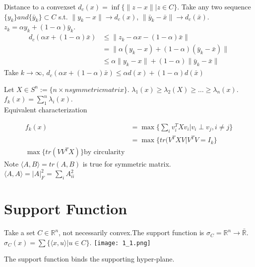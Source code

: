 \documentclass[11pt]{book} %
\def\R{\mathbb{R}}
\newcommand{\cvx}{convex}
\begin{document}
\begin{example}[Distance]
Distance to a \cvx  set $d_c(x) = \inf \{ \| z-x \| | z \in C \}$. Take any two sequence $\{ y_k\} and \{ \bar{y}_k\} \subset C$ s.t. $\| y_k - x\| \to d_c(x)$, $\| \bar{y}_k - \bar{x}\| \to d_c(\bar{x})$. $z_k = \alpha y_k + (1 - \alpha) \bar{y}_k$.
\begin{align*}
d_c(\alpha x + (1-\alpha) \bar{x}) &\le \| z_k - \alpha x - (1 - \alpha) \bar{x}\| \\
& = \| \alpha(y_k - x) + (1 - \alpha)(\bar{y}_k - \bar{x})\| \\
& \le \alpha \| y_k - x\| + (1 - \alpha ) \|\bar{y}_k - \bar{x}\|
\end{align*}
Take $k \to \infty$, $d_c(\alpha x + (1 - \alpha) \bar{x}) \le \alpha d(x) + (1 - \alpha) d(\bar{x})$
\end{example}
\begin{example}[Eigenvalues]
Let $X \in S^n := \{ n \times n symmetric matrix\}$. $\lambda_1(x) \ge \lambda_2(X) \ge \ldots \ge \lambda_n(x)$.\\
$f_k(x) = \sum_{1}^n \lambda_i(x)$.\\
Equivalent characterization 

\begin{align*}
f_k(x) & = \max\{ \sum_{i} v_i^T Xv_i | v_i \perp v_j , i \neq j\} \\
& =  \max\{ tr( V^TXV | V^T V = I_k \} \\
\max \{tr(VV^TX) \} \text{by circularity}
\end{align*}
Note $\langle A,B\rangle  = tr(A,B)$ is true for symmetric matrix. \\
$\langle A,A\rangle  = |A |_F^2 = \sum_{i} A_{ii}^2$
\end{example}

\section{Support Function}
Take a set $C \in \R^n$, not necessarily convex.The support function is $\sigma_C = \R^n \to \bar{\R}$. $\sigma_C(x) = \sum \{ \langle x,u\rangle  | u \in C\}$.
\texttt{[image: 1\_1.png]}
\begin{fact}
The support function binds the supporting hyper-plane.
\end{fact}
\end{document}
